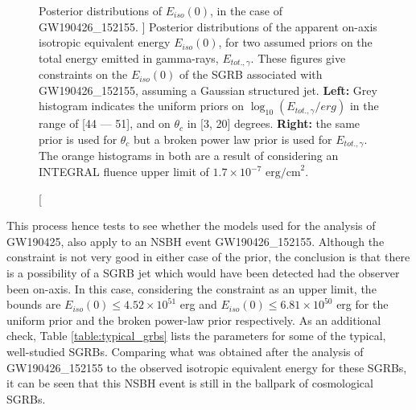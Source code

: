     \begin{figure}[H]
        \begin{subfigure}{0.5\textwidth}
              \label{fig:nsbh_unif}
              \centering
              \def\svgwidth{\textwidth}
              
        \end{subfigure}%
        \begin{subfigure}{0.5\textwidth}
              \label{fig:nsbh_bpl}
              \centering
              \def\svgwidth{\textwidth}
              
        \end{subfigure}
        \caption
        [
            Posterior distributions of $E_{iso}(0)$, in the case of GW190426\_152155.
        ]
        {
            Posterior distributions of the apparent on-axis isotropic equivalent energy
            $E_{iso}(0)$, for two assumed priors on the total energy emitted in
            gamma-rays, $E_{tot., \gamma}$. These figures give constraints on the
            $E_{iso}(0)$ of the SGRB associated with GW190426\_152155, assuming a
            Gaussian structured jet. \textbf{Left:} Grey histogram indicates the uniform
            priors on $\log_{10}(E_{tot., \gamma}/erg)$ in the range of [44 --- 51], and
            on $\theta_c$ in [3, 20] degrees. \textbf{Right:} the same prior is used for
            $\theta_c$ but a broken power law prior is used for $E_{tot., \gamma}$. The
            orange histograms in both are a result of considering an INTEGRAL fluence
            upper limit of $1.7 \times 10^{-7} \text{ erg/cm}^2$.
        }
        \label{fig:nsbh_unif_bpl}
    \end{figure}

    This process hence tests to see whether the models used for the analysis of
    GW190425, also apply to an NSBH event GW190426\_152155. Although the constraint is
    not very good in either case of the prior, the conclusion is that there is a
    possibility of a SGRB jet which would have been detected had the observer been
    on-axis. In this case, considering the constraint as an upper limit, the bounds are
    $E_{iso}(0) \leq 4.52 \times 10^{51}$ erg and $E_{iso}(0) \leq 6.81 \times 10^{50}$
    erg for the uniform prior and the broken power-law prior respectively.  As an
    additional check, Table \ref{table:typical_grbs} lists the parameters for some of
    the typical, well-studied SGRBs. Comparing what was obtained after the analysis of
    GW190426\_152155 to the observed isotropic equivalent energy for these SGRBs, it can
    be seen that this NSBH event is still in the ballpark of cosmological SGRBs.

